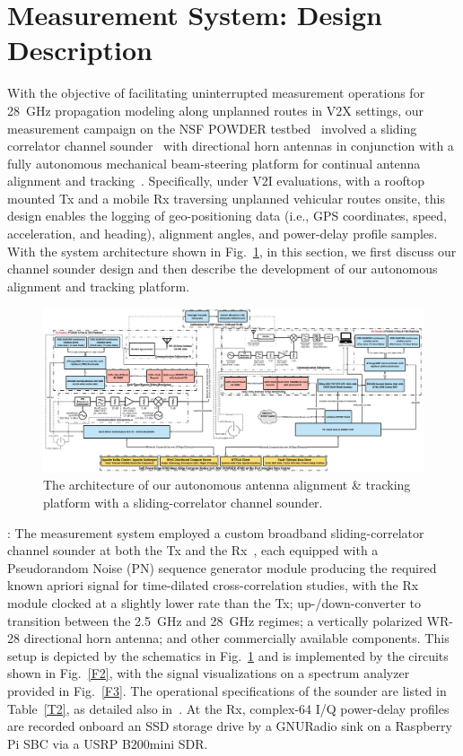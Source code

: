 \documentclass[12pt, draftcls, onecolumn]{IEEEtran}
\begin{document}
\section{Measurement System: Design Description}\label{S2}
With the objective of facilitating uninterrupted measurement operations for \SI{28}{\giga\hertz} propagation modeling along unplanned routes in V$2$X settings, our measurement campaign on the NSF POWDER testbed~\cite{POWDER} involved a sliding correlator channel sounder~\cite{Purdue} with directional horn antennas in conjunction with a fully autonomous mechanical beam-steering platform for continual antenna alignment and tracking~\cite{NRSM}. Specifically, under V$2$I evaluations, with a rooftop mounted Tx and a mobile Rx traversing unplanned vehicular routes onsite, this design enables the logging of geo-positioning data (i.e., GPS coordinates, speed, acceleration, and heading), alignment angles, and power-delay profile samples. With the system architecture shown in Fig.~\ref{F1}, in this section, we first discuss our channel sounder design and then describe the development of our autonomous alignment and tracking platform.
\begin{figure} [t]
    \centering
    \includegraphics[width=1.0\textwidth]{figs/system_architecture.jpg}
    \vspace{-6mm}
    \caption{The architecture of our autonomous antenna alignment \& tracking platform with a sliding-correlator channel sounder.}
    \label{F1}
\end{figure}

: The measurement system employed a custom broadband sliding-correlator channel sounder at both the Tx and the Rx~\cite{Purdue}, each equipped with a Pseudorandom Noise (PN) sequence generator module producing the required known apriori signal for time-dilated cross-correlation studies, with the Rx module clocked at a slightly lower rate than the Tx; up-/down-converter to transition between the \SI{2.5}{\giga\hertz} and \SI{28}{\giga\hertz} regimes; a vertically polarized WR-28 directional horn antenna; and other commercially available components. This setup is depicted by the schematics in Fig.~\ref{F1} and is implemented by the circuits shown in Fig.~\ref{F2}, with the signal visualizations on a spectrum analyzer provided in Fig.~\ref{F3}. The operational specifications of the sounder are listed in Table~\ref{T2}, as detailed also in~\cite{Purdue}. At the Rx, complex-\SI{64}{} I/Q power-delay profiles are recorded onboard an SSD storage drive by a GNURadio sink on a Raspberry Pi SBC via a USRP B$200$mini SDR.
\end{document}
